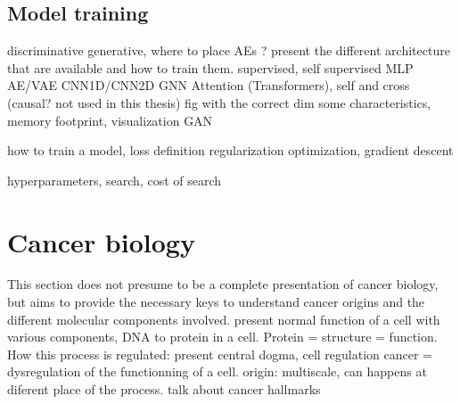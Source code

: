 \documentclass[../main.tex]{subfiles}
\begin{document}
 \subsection{}

 \subsection{}

 \subsection{Model training}

     discriminative generative, where to place AEs ?
     present the different architecture that are available and how to train them.
     supervised, self supervised
     MLP
     AE/VAE
     CNN1D/CNN2D
     GNN
     Attention (Transformers), self and cross (causal? not used in this thesis)
     fig with the correct dim
     some characteristics, memory footprint, visualization
     GAN

     how to train a model, loss definition
     regularization
     optimization, gradient descent

     hyperparameters, search, cost of search

\section{Cancer biology}
 This section does not presume to be a complete presentation of cancer biology, but aims to provide the necessary keys to understand cancer origins and the different molecular components involved.
 present normal function of a cell with various components, DNA to protein in a cell. Protein = structure = function.
 How this process is regulated: present central dogma, cell regulation
 cancer = dysregulation of the functionning of a cell.
 origin: multiscale, can happens at diferent place of the process.
 talk about cancer hallmarks
\end{document}
